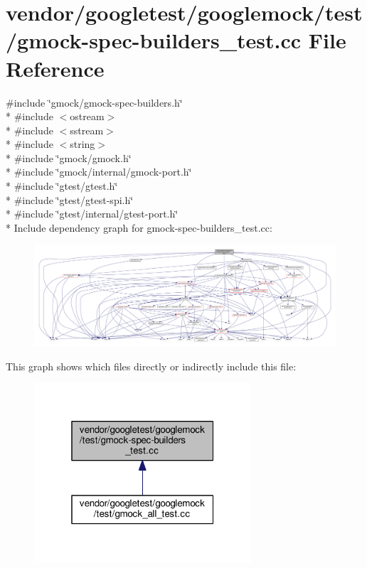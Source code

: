 \hypertarget{gmock-spec-builders__test_8cc}{}\section{vendor/googletest/googlemock/test/gmock-\/spec-\/builders\+\_\+test.cc File Reference}
\label{gmock-spec-builders__test_8cc}
{\ttfamily \#include \char`\"{}gmock/gmock-\/spec-\/builders.\+h\char`\"{}}\\*
{\ttfamily \#include $<$ostream$>$}\\*
{\ttfamily \#include $<$sstream$>$}\\*
{\ttfamily \#include $<$string$>$}\\*
{\ttfamily \#include \char`\"{}gmock/gmock.\+h\char`\"{}}\\*
{\ttfamily \#include \char`\"{}gmock/internal/gmock-\/port.\+h\char`\"{}}\\*
{\ttfamily \#include \char`\"{}gtest/gtest.\+h\char`\"{}}\\*
{\ttfamily \#include \char`\"{}gtest/gtest-\/spi.\+h\char`\"{}}\\*
{\ttfamily \#include \char`\"{}gtest/internal/gtest-\/port.\+h\char`\"{}}\\*
Include dependency graph for gmock-\/spec-\/builders\+\_\+test.cc\+:
\nopagebreak
\begin{figure}[H]
\begin{center}
\leavevmode
\includegraphics[width=350pt]{gmock-spec-builders__test_8cc__incl}
\end{center}
\end{figure}
This graph shows which files directly or indirectly include this file\+:
\nopagebreak
\begin{figure}[H]
\begin{center}
\leavevmode
\includegraphics[width=229pt]{gmock-spec-builders__test_8cc__dep__incl}
\end{center}
\end{figure}
